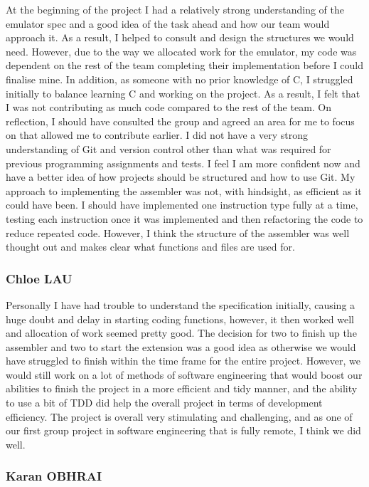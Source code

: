 \documentclass[11pt]{article}
\begin{document}
At the beginning of the project I had a relatively strong understanding of the emulator spec and a good idea of the task ahead and how our team would approach it. As a result, I helped to consult and design the structures we would need. However, due to the way we allocated work for the emulator, my code was dependent on the rest of the team completing their implementation before I could finalise mine. In addition, as someone with no prior knowledge of C, I struggled initially to balance learning C and working on the project. As a result, I felt that I was not contributing as much code compared to the rest of the team. On reflection, I should have consulted the group and agreed an area for me to focus on that allowed me to contribute earlier. I did not have a very strong understanding of Git and version control other than what was required for previous programming assignments and tests. I feel I am more confident now and have a better idea of how projects should be structured and how to use Git. My approach to implementing the assembler was not, with hindsight, as efficient as it could have been. I should have implemented one instruction type fully at a time, testing each instruction once it was implemented and then refactoring the code to reduce repeated code. However, I think the structure of the assembler was well thought out and makes clear what functions and files are used for.

\subsubsection{Chloe LAU}

Personally I have had trouble to understand the specification initially, causing a huge doubt and delay in starting coding functions, however, it then worked well and allocation of work seemed pretty good. The decision for two to finish up the assembler and two to start the extension was a good idea as otherwise we would have struggled to finish within the time frame for the entire project. However, we would still work on a lot of methods of software engineering that would boost our abilities to finish the project in a more efficient and tidy manner, and the ability to use a bit of TDD did help the overall project in terms of development efficiency. The project is overall very stimulating and challenging, and as one of our first group project in software engineering that is fully remote, I think we did well.

\subsubsection{Karan OBHRAI}
\end{document}
